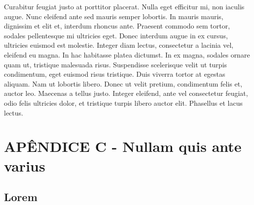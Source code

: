	Curabitur feugiat justo at porttitor placerat. Nulla eget efficitur mi, non iaculis augue. Nunc eleifend ante sed mauris semper lobortis. In mauris mauris, dignissim et elit et, interdum rhoncus ante. Praesent commodo sem tortor, sodales pellentesque mi ultricies eget. Donec interdum augue in ex cursus, ultricies euismod est molestie. Integer diam lectus, consectetur a lacinia vel, eleifend eu magna. In hac habitasse platea dictumst. In ex magna, sodales ornare quam ut, tristique malesuada risus. Suspendisse scelerisque velit ut turpis condimentum, eget euismod risus tristique. Duis viverra tortor at egestas aliquam. Nam ut lobortis libero. Donec ut velit pretium, condimentum felis et, auctor leo. Maecenas a tellus justo. Integer eleifend, ante vel consectetur feugiat, odio felis ultricies dolor, et tristique turpis libero auctor elit. Phasellus et lacus lectus.   

\chapter*{APÊNDICE C - Nullam quis ante varius}

	\renewcommand{\theintro}{C}
	\label{app:C}

  
	\section*{Lorem}
	
